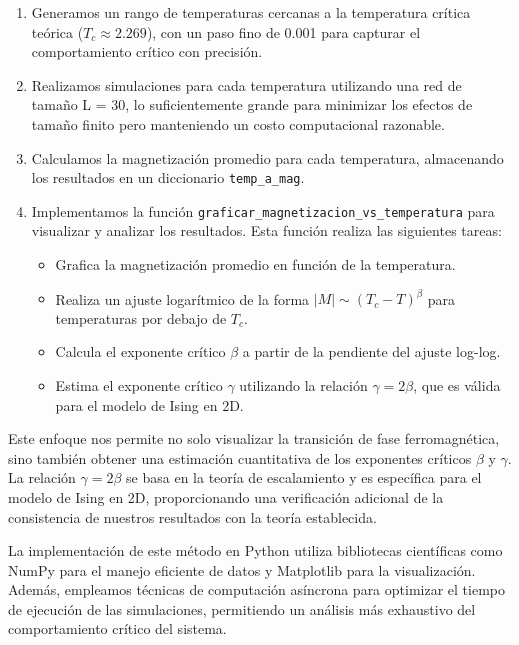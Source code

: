 \documentclass[twocolumn]{article}
\begin{document}
\begin{enumerate}
    \item Generamos un rango de temperaturas cercanas a la temperatura crítica teórica ($T_c \approx 2.269$), con un paso fino de 0.001 para capturar el comportamiento crítico con precisión.
    
    \item Realizamos simulaciones para cada temperatura utilizando una red de tamaño L = 30, lo suficientemente grande para minimizar los efectos de tamaño finito pero manteniendo un costo computacional razonable.
    
    \item Calculamos la magnetización promedio para cada temperatura, almacenando los resultados en un diccionario \texttt{temp\_a\_mag}.
    
    \item Implementamos la función \texttt{graficar\_magnetizacion\_vs\_temperatura} para visualizar y analizar los resultados. Esta función realiza las siguientes tareas:
    \begin{itemize}
        \item Grafica la magnetización promedio en función de la temperatura.
        \item Realiza un ajuste logarítmico de la forma $|M| \sim (T_c - T)^\beta$ para temperaturas por debajo de $T_c$.
        \item Calcula el exponente crítico $\beta$ a partir de la pendiente del ajuste log-log.
        \item Estima el exponente crítico $\gamma$ utilizando la relación $\gamma = 2\beta$, que es válida para el modelo de Ising en 2D.
    \end{itemize}
\end{enumerate}

Este enfoque nos permite no solo visualizar la transición de fase ferromagnética, sino también obtener una estimación cuantitativa de los exponentes críticos $\beta$ y $\gamma$. La relación $\gamma = 2\beta$ se basa en la teoría de escalamiento y es específica para el modelo de Ising en 2D, proporcionando una verificación adicional de la consistencia de nuestros resultados con la teoría establecida.

La implementación de este método en Python utiliza bibliotecas científicas como NumPy para el manejo eficiente de datos y Matplotlib para la visualización. Además, empleamos técnicas de computación asíncrona para optimizar el tiempo de ejecución de las simulaciones, permitiendo un análisis más exhaustivo del comportamiento crítico del sistema.
\end{document}
